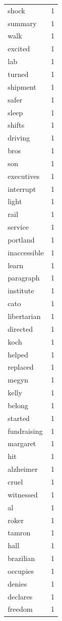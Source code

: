 \begin{tabular}{lr}
shock & 1 \\
summary & 1 \\
walk & 1 \\
excited & 1 \\
lab & 1 \\
turned & 1 \\
shipment & 1 \\
safer & 1 \\
sleep & 1 \\
shifts & 1 \\
driving & 1 \\
bros & 1 \\
son & 1 \\
executives & 1 \\
interrupt & 1 \\
light & 1 \\
rail & 1 \\
service & 1 \\
portland & 1 \\
inaccessible & 1 \\
learn & 1 \\
paragraph & 1 \\
institute & 1 \\
cato & 1 \\
libertarian & 1 \\
directed & 1 \\
koch & 1 \\
helped & 1 \\
replaced & 1 \\
megyn & 1 \\
kelly & 1 \\
belong & 1 \\
started & 1 \\
fundraising & 1 \\
margaret & 1 \\
hit & 1 \\
alzheimer & 1 \\
cruel & 1 \\
witnessed & 1 \\
al & 1 \\
roker & 1 \\
tamron & 1 \\
hall & 1 \\
brazilian & 1 \\
occupies & 1 \\
denies & 1 \\
declares & 1 \\
freedom & 1 \\

\end{tabular}
